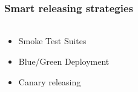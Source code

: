 \documentclass{beamer}
\begin{document}
\begin{frame}
	\frametitle{Smart releasing strategies}
	\framesubtitle{}
\begin{columns}
 \begin{column}{.49\textwidth}
	\begin{itemize}
		\item Smoke Test Suites
		\item Blue/Green Deployment
		\item Canary releasing
	\end{itemize}
\end{column}
\begin{column}{.49\textwidth}
	\begin{figure}
		\begin{center}

\end{center}
\end{figure}
\end{column}
\end{columns}
\end{frame}
\end{document}
